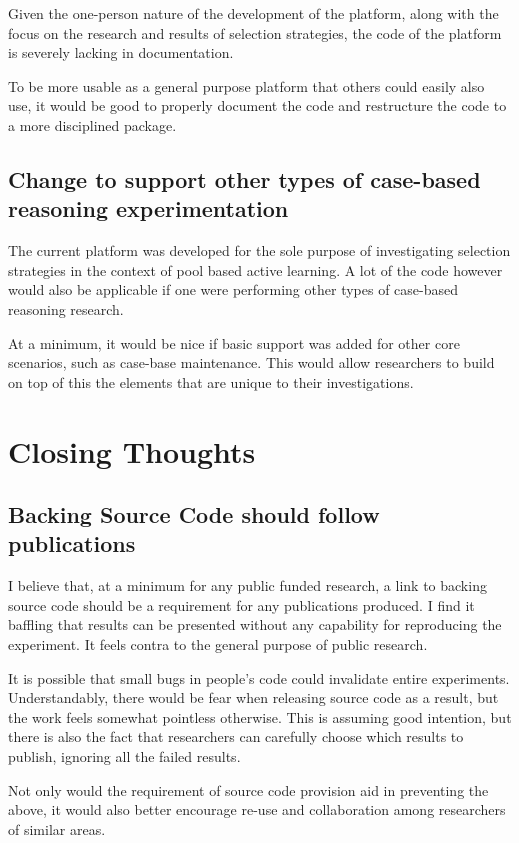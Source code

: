 \documentclass[a4paper,11pt]{report}
\begin{document}
Given the one-person nature of the development of the platform, along with the focus on the research and results of selection strategies, the code of the platform is severely lacking in documentation. 

To be more usable as a general purpose platform that others could easily also use, it would be good to properly document the code and restructure the code to a more disciplined package. 

\subsection{Change to support other types of case-based reasoning experimentation}

The current platform was developed for the sole purpose of investigating selection strategies in the context of pool based active learning. A lot of the code however would also be applicable if one were performing other types of case-based reasoning research.

At a minimum, it would be nice if basic support was added for other core scenarios, such as case-base maintenance. This would allow researchers to build on top of this the elements that are unique to their investigations.

\section{Closing Thoughts}
\subsection{Backing Source Code should follow publications}
I believe that, at a minimum for any public funded research, a link to backing source code should be a requirement for any publications produced. I find it baffling that results can be presented without any capability for reproducing the experiment. It feels contra to the general purpose of public research.

It is possible that small bugs in people's code could invalidate entire experiments. Understandably, there would be fear when releasing source code as a result, but the work feels somewhat pointless otherwise. This is assuming good intention, but there is also the fact that researchers can carefully choose which results to publish, ignoring all the failed results.

Not only would the requirement of source code provision aid in preventing the above, it would also better encourage re-use and collaboration among researchers of similar areas.
\end{document}
